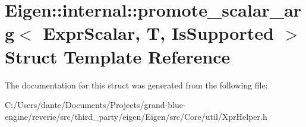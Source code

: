 \hypertarget{struct_eigen_1_1internal_1_1promote__scalar__arg}{}\section{Eigen\+::internal\+::promote\+\_\+scalar\+\_\+arg$<$ Expr\+Scalar, T, Is\+Supported $>$ Struct Template Reference}
\label{struct_eigen_1_1internal_1_1promote__scalar__arg}


The documentation for this struct was generated from the following file\+:\begin{DoxyCompactItemize}
\item 
C\+:/\+Users/dante/\+Documents/\+Projects/grand-\/blue-\/engine/reverie/src/third\+\_\+party/eigen/\+Eigen/src/\+Core/util/Xpr\+Helper.\+h\end{DoxyCompactItemize}
